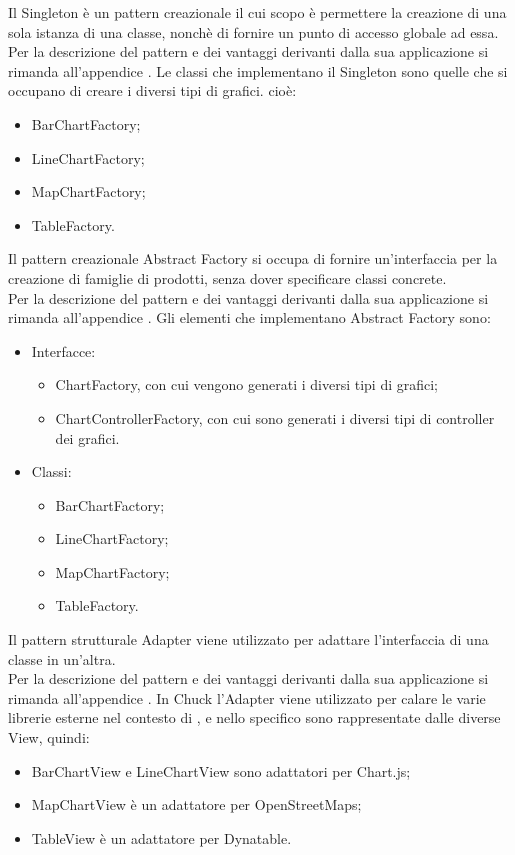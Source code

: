 	Il Singleton è un pattern creazionale il cui scopo è permettere la creazione di una sola istanza di una classe, nonchè di fornire un punto di accesso globale ad essa.\\
	Per la descrizione del pattern e dei vantaggi derivanti dalla sua applicazione si rimanda all'appendice .
	Le classi che implementano il Singleton sono quelle che si occupano di creare i diversi tipi di grafici. cioè:
	\begin{itemize}
	\item BarChartFactory;
	\item LineChartFactory;
	\item MapChartFactory;
	\item TableFactory.
	\end{itemize}
	Il pattern creazionale Abstract Factory si occupa di fornire un'interfaccia per la creazione di famiglie di prodotti, senza dover specificare classi concrete. \\
	Per la descrizione del pattern e dei vantaggi derivanti dalla sua applicazione si rimanda all'appendice .
	Gli elementi che implementano Abstract Factory sono:
	\begin{itemize}
	\item Interfacce:
		\begin{itemize}
			\item ChartFactory, con cui vengono generati i diversi tipi di grafici;
			\item ChartControllerFactory, con cui sono generati i diversi tipi di controller dei grafici.
		\end{itemize}
	\item Classi:
		\begin{itemize}
			\item BarChartFactory;
			\item LineChartFactory;
			\item MapChartFactory;
			\item TableFactory.
		\end{itemize}
	\end{itemize}
	Il pattern strutturale Adapter viene utilizzato per adattare l'interfaccia di una classe in un'altra.\\
	Per la descrizione del pattern e dei vantaggi derivanti dalla sua applicazione si rimanda all'appendice .
	In Chuck l'Adapter viene utilizzato per calare le varie librerie esterne nel contesto di \projectname{}, e nello specifico sono rappresentate dalle diverse View, quindi:
	\begin{itemize}
	\item BarChartView e LineChartView sono adattatori per Chart.js;
	\item MapChartView è un adattatore per OpenStreetMaps;
	\item TableView è un adattatore per Dynatable.
	\end{itemize}
	
